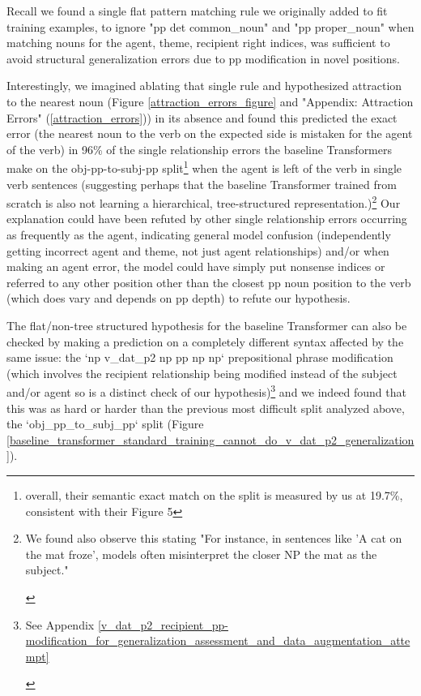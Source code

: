 \documentclass[11pt]{article}
\begin{document}
Recall we found a single flat pattern matching rule we originally added to fit training examples, to ignore "pp det common\_noun" and "pp proper\_noun" when matching nouns for the agent, theme, recipient right indices, was sufficient to avoid structural generalization errors due to pp modification in novel positions. 

Interestingly, we imagined ablating that single rule and hypothesized attraction to the nearest noun (Figure \ref{attraction_errors_figure} and "Appendix: Attraction Errors" (\ref{attraction_errors})) in its absence and found this predicted the exact error (the nearest noun to the verb on the expected side is mistaken for the agent of the verb) 
in 96\% of the single relationship errors the \cite{Wu2023} baseline Transformers make on the obj-pp-to-subj-pp split\footnote{overall, their semantic exact match on the split is measured by us at 19.7\%, consistent with their Figure 5} when the agent is left of the verb in single verb sentences
(suggesting perhaps that the baseline \cite{Wu2023} Transformer trained from scratch is also not learning a hierarchical, tree-structured representation.)\footnote{\begin{footnotesize}We found \cite{li2023slogstructuralgeneralizationbenchmark} also observe this stating "For instance, in sentences like 'A cat on the mat froze', models often misinterpret the closer NP the mat as the subject."\end{footnotesize}}
Our explanation could have been refuted by other single relationship errors occurring as frequently as the agent, indicating general model confusion (independently getting incorrect agent and theme, not just agent relationships) and/or when making an agent error, the model could have simply put nonsense indices or referred to any other position other than the closest pp noun position to the verb (which does vary and depends on pp depth) to refute our hypothesis.

The flat/non-tree structured hypothesis for the baseline Transformer can also be checked by making a prediction on a completely different syntax affected by the same issue: the `np v\_dat\_p2 np pp np np` prepositional phrase modification (which involves the recipient relationship being modified instead of the subject and/or agent so is a distinct check of our hypothesis)\footnote{\begin{footnotesize}See Appendix \ref{v_dat_p2_recipient_pp-modification_for_generalization_assessment_and_data_augmentation_attempt}\end{footnotesize}} and we indeed found that this was as hard or harder than the previous most difficult split analyzed above, the `obj\_pp\_to\_subj\_pp` split (Figure \ref{baseline_transformer_standard_training_cannot_do_v_dat_p2_generalization}).
\end{document}
